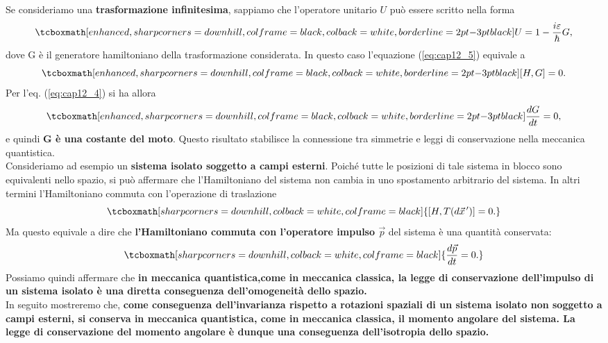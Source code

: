 Se consideriamo una \textbf{trasformazione infinitesima}, sappiamo che l'operatore unitario ${U}$ può essere scritto nella forma 
	\begin{equation}
		\tcboxmath[enhanced, sharp corners=downhill, colframe=black, colback=white, borderline={2pt}{-3pt}{black}]{
			{U}= 1- \frac{i\varepsilon}{\hbar}G,
			}
	\end{equation}
dove G è il generatore hamiltoniano della trasformazione considerata. In questo caso l'equazione (\ref{eq:cap12_5}) equivale a 
	\begin{equation} 
		\tcboxmath[enhanced, sharp corners=downhill, colframe=black, colback=white, borderline={2pt}{-3pt}{black}]{
			[H,G]=0.
			}
	\end{equation}
Per l'eq. (\ref{eq:cap12_4}) si ha allora
	\begin{equation}
		\tcboxmath[enhanced, sharp corners=downhill, colframe=black, colback=white, borderline={2pt}{-3pt}{black}]{
			\frac{dG}{dt}=0,
			}
	\end{equation}
e quindi \textbf{G è una costante del moto}. Questo risultato stabilisce la connessione tra simmetrie e leggi di conservazione nella meccanica quantistica.\\

Consideriamo ad esempio un \textbf{sistema isolato soggetto a campi esterni}. Poiché tutte le posizioni di tale sistema in blocco sono equivalenti nello spazio, si può affermare che l'Hamiltoniano del sistema non cambia in uno spostamento arbitrario del sistema. In altri termini l'Hamiltoniano commuta con l'operazione di traslazione
	\begin{equation}
		\tcboxmath[sharp corners=downhill, colback=white, colframe=black]{
			[H,T (d\vec{x}^{\, \prime})]=0.
			}
\end{equation}
Ma questo equivale a dire che \textbf{l'Hamiltoniano commuta con l'operatore impulso $\vec{p}$} del sistema è una quantità conservata:
	\begin{equation}
		\tcboxmath[sharp corners=downhill, colback=white, colframe=black]{
			\frac{d\vec{p}}{dt}=0.
			}
	\end{equation}
Possiamo quindi affermare che \textbf{in meccanica quantistica,come in meccanica classica, la legge di conservazione dell'impulso di un sistema isolato è una diretta conseguenza dell'omogeneità dello spazio.}\\

In seguito mostreremo che, \textbf{come conseguenza dell'invarianza rispetto a rotazioni spaziali di un sistema isolato non soggetto a campi esterni, si conserva in meccanica quantistica, come in meccanica classica, il momento angolare del sistema. La legge di conservazione del momento angolare è dunque una conseguenza dell'isotropia dello spazio.}\\

